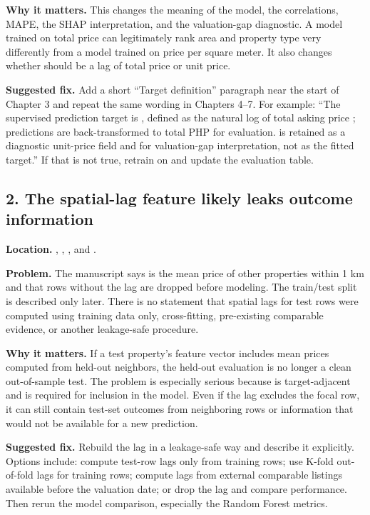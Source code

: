 \documentclass[11pt]{article}
\begin{document}
\textbf{Why it matters.} This changes the meaning of the model, the correlations, MAPE, the SHAP interpretation, and the valuation-gap diagnostic. A model trained on total price can legitimately rank area and property type very differently from a model trained on price per square meter. It also changes whether  should be a lag of total price or unit price.

\textbf{Suggested fix.} Add a short ``Target definition'' paragraph near the start of Chapter 3 and repeat the same wording in Chapters 4--7. For example: ``The supervised prediction target is , defined as the natural log of total asking price ; predictions are back-transformed to total PHP for evaluation.  is retained as a diagnostic unit-price field and for valuation-gap interpretation, not as the fitted target.'' If that is not true, retrain on  and update the evaluation table.

\subsection*{2. The spatial-lag feature likely leaks outcome information}

\textbf{Location.} , , , and .

\textbf{Problem.} The manuscript says  is the mean price of other properties within 1 km and that rows without the lag are dropped before modeling. The train/test split is described only later. There is no statement that spatial lags for test rows were computed using training data only, cross-fitting, pre-existing comparable evidence, or another leakage-safe procedure.

\textbf{Why it matters.} If a test property's feature vector includes mean prices computed from held-out neighbors, the held-out evaluation is no longer a clean out-of-sample test. The problem is especially serious because  is target-adjacent and is required for inclusion in the model. Even if the lag excludes the focal row, it can still contain test-set outcomes from neighboring rows or information that would not be available for a new prediction.

\textbf{Suggested fix.} Rebuild the lag in a leakage-safe way and describe it explicitly. Options include: compute test-row lags only from training rows; use K-fold out-of-fold lags for training rows; compute lags from external comparable listings available before the valuation date; or drop the lag and compare performance. Then rerun the model comparison, especially the Random Forest metrics.
\end{document}
